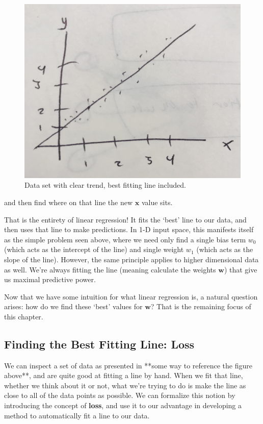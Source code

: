 \begin{figure}[H]
    \centering
    \includegraphics[width=0.5\paperwidth]{../LinearRegression/fig/simple_lin_reg_w_line.jpg}
    \caption{Data set with clear trend, best fitting line included.}
    \label{fig:simple-lin-reg-w-line}
\end{figure}

and then find where on that line the new $\textbf{x}$ value sits.

That is the entirety of linear regression! It fits the `best' line to our data, and then uses that line to make predictions. In 1-D input space, this manifests itself as the simple problem seen above, where we need only find a single bias term $w_{0}$ (which acts as the intercept of the line) and single weight $w_{1}$ (which acts as the slope of the line). However, the same principle applies to higher dimensional data as well. We're always fitting the line (meaning calculate the weights $\textbf{w}$) that give us maximal predictive power.


Now that we have some intuition for what linear regression is, a natural question arises: how do we find these `best' values for $\textbf{w}$? That is the remaining focus of this chapter.

\subsection{Finding the Best Fitting Line: Loss}
We can inspect a set of data as presented in **some way to reference the figure above**, and are quite good at fitting a line by hand. When we fit that line, whether we think about it or not, what we're trying to do is make the line as close to all of the data points as possible. We can formalize this notion by introducing the concept of \textbf{loss}, and use it to our advantage in developing a method to automatically fit a line to our data.


